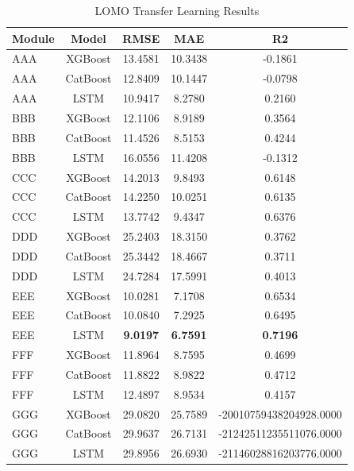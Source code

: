 \begin{table}[htbp]
\centering
\caption{LOMO Transfer Learning Results}
\label{tab:lomo}
\begin{tabular}{lcccc}
\hline
Module & Model & RMSE & MAE & R2 \\
\hline
AAA & XGBoost & 13.4581 & 10.3438 & -0.1861 \\
AAA & CatBoost & 12.8409 & 10.1447 & -0.0798 \\
AAA & LSTM & 10.9417 & 8.2780 & 0.2160 \\
BBB & XGBoost & 12.1106 & 8.9189 & 0.3564 \\
BBB & CatBoost & 11.4526 & 8.5153 & 0.4244 \\
BBB & LSTM & 16.0556 & 11.4208 & -0.1312 \\
CCC & XGBoost & 14.2013 & 9.8493 & 0.6148 \\
CCC & CatBoost & 14.2250 & 10.0251 & 0.6135 \\
CCC & LSTM & 13.7742 & 9.4347 & 0.6376 \\
DDD & XGBoost & 25.2403 & 18.3150 & 0.3762 \\
DDD & CatBoost & 25.3442 & 18.4667 & 0.3711 \\
DDD & LSTM & 24.7284 & 17.5991 & 0.4013 \\
EEE & XGBoost & 10.0281 & 7.1708 & 0.6534 \\
EEE & CatBoost & 10.0840 & 7.2925 & 0.6495 \\
EEE & LSTM & \textbf{9.0197} & \textbf{6.7591} & \textbf{0.7196} \\
FFF & XGBoost & 11.8964 & 8.7595 & 0.4699 \\
FFF & CatBoost & 11.8822 & 8.9822 & 0.4712 \\
FFF & LSTM & 12.4897 & 8.9534 & 0.4157 \\
GGG & XGBoost & 29.0820 & 25.7589 & -20010759438204928.0000 \\
GGG & CatBoost & 29.9637 & 26.7131 & -21242511235511076.0000 \\
GGG & LSTM & 29.8956 & 26.6930 & -21146028816203776.0000 \\
\hline
\end{tabular}
\end{table}
